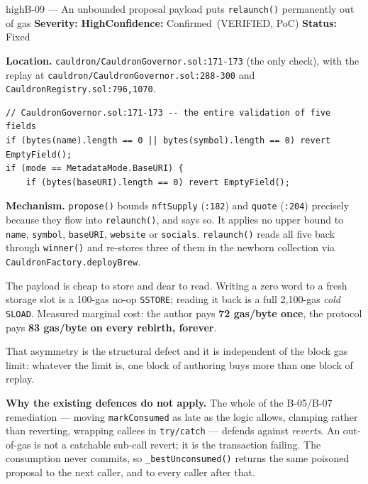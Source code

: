\documentclass[11pt,a4paper]{article}
\newcommand{\SevHigh}{\textcolor{high}{\textbf{High}}}
\newcommand{\Conf}{\textcolor{critical}{Confirmed}}
\newcommand{\Fixed}{\textcolor{good}{Fixed}}
\newcommand{\code}[1]{\texttt{\small #1}}
\newcommand{\fileref}[1]{\texttt{\scriptsize #1}}
\begin{document}
\begin{findingbox}{high}{B-09 --- An unbounded proposal payload puts \code{relaunch()} permanently out of gas}
\textbf{Severity:} \SevHigh \quad \textbf{Confidence:} \Conf\ (VERIFIED, PoC) \quad
\textbf{Status:} \Fixed

\medskip
\textbf{Location.} \fileref{cauldron/CauldronGovernor.sol:171-173} (the only check), with
the replay at \fileref{cauldron/CauldronGovernor.sol:288-300} and
\fileref{CauldronRegistry.sol:796,1070}.

\begin{lstlisting}
// CauldronGovernor.sol:171-173 -- the entire validation of five fields
if (bytes(name).length == 0 || bytes(symbol).length == 0) revert EmptyField();
if (mode == MetadataMode.BaseURI) {
    if (bytes(baseURI).length == 0) revert EmptyField();
\end{lstlisting}

\textbf{Mechanism.} \code{propose()} bounds \code{nftSupply} (\fileref{:182}) and
\code{quote} (\fileref{:204}) precisely because they flow into \code{relaunch()}, and says
so. It applies no upper bound to \code{name}, \code{symbol}, \code{baseURI},
\code{website} or \code{socials}. \code{relaunch()} reads all five back through
\code{winner()} and re-stores three of them in the newborn collection via
\code{CauldronFactory.deployBrew}.

The payload is cheap to store and dear to read. Writing a zero word to a fresh storage slot
is a 100-gas no-op \code{SSTORE}; reading it back is a full 2{,}100-gas \emph{cold}
\code{SLOAD}. Measured marginal cost: the author pays \textbf{72 gas/byte once}, the
protocol pays \textbf{83 gas/byte on every rebirth, forever}.

That asymmetry is the structural defect and it is independent of the block gas limit:
whatever the limit is, one block of authoring buys more than one block of replay.

\textbf{Why the existing defences do not apply.} The whole of the B-05/B-07 remediation ---
moving \code{markConsumed} as late as the logic allows, clamping rather than reverting,
wrapping callees in \code{try/catch} --- defends against \emph{reverts}. An out-of-gas is
not a catchable sub-call revert; it is the transaction failing. The consumption never
commits, so \code{\_bestUnconsumed()} returns the same poisoned proposal to the next
caller, and to every caller after that.


\end{findingbox}
\end{document}
